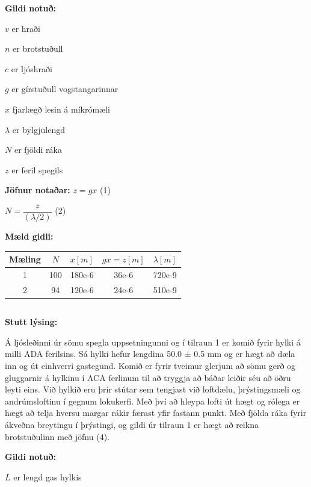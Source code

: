 \documentclass[12pt]{article}
\begin{document}
\textbf{Gildi notuð:}
\bigskip

 
 $v$ er hraði
 
 
 $n$ er brotstuðull
 
 
 $c$ er ljóshraði 
 

 $g$ er  gírstuðull vogstangarinnar
 

$x$ fjarlægð lesin á míkrómæli

 
 $\lambda$ er bylgjulengd
 
 
 $N$ er fjöldi ráka


 $z$ er feril spegils
 
 
 \bigskip


\textbf{Jöfnur notaðar:}
\bigskip
$ z=gx $ (1)


$N = \dfrac{z}{(\lambda/2)}$ (2)
\bigskip


\textbf{Mæld gidli:}

\begin{table}[H]
    \begin{tabular}{|c|c|c|c|c|}
    Mæling & $N$ & $x [m]$ & $gx=z [m]$ & $\lambda [m]$\\
    \hline
    1 & 100 & 180e-6 & 36e-6 & 720e-9 \\
    \hline
    2 & 94 & 120e-6 & 24e-6 & 510e-9 \\
    \end{tabular}
\end{table}

\subsection{}

\textbf{Stutt lýsing:}
\bigskip

Á ljósleðinni úr sömu spegla uppsetningunni og í tilraun 1 er komið fyrir hylki á milli ADA ferilsins. 
Sá hylki hefur lengdina 50.0 ± 0.5 mm og er hægt að dæla inn og út einhverri gastegund. Komið er fyrir 
tveimur glerjum að sömu gerð og gluggarnir á hylkinu í ACA ferlinum til að tryggja að báðar leiðir séu
að öðru leyti eins. Við hylkið eru þrír stútar sem tengjast við loftdælu, þrýstingsmæli og andrúmsloftinu
í gegnum lokukerfi. Með því að hleypa lofti út hægt og rólega er hægt að telja hversu margar rákir færast
yfir fastann punkt. Með fjölda ráka fyrir ákveðna breytingu í þrýstingi, og gildi úr tilraun 1 er 
hægt að reikna brotstuðulinn með jöfnu (4). 
\bigskip

\textbf{Gildi notuð:}

\bigskip
$L$ er lengd gas hylkis
\end{document}
